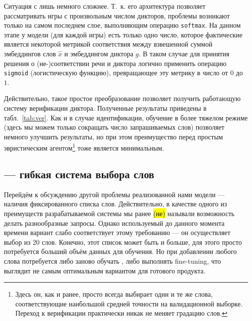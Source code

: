 Ситуация с \guesser{} лишь немного сложнее. Т.~к. его архитектура позволяет
рассматривать игры с произвольным числом дикторов, проблемы возникают только на
самом последнем слое, выполняющим операцию \texttt{softmax}. На данном этапе у
модели (для каждой игры) есть только одно число, которое фактические является
некоторой метрикой соответствия между взвешенной суммой эмбеддингов слов
$\hat{x}$ и эмбеддингом диктора $g$. В таком случае для принятия решения о
(не-)соответствии речи и диктора логично применить операцию \texttt{sigmoid}
(логистическую функцию), превращающее эту метрику в число от $0$ до $1$.

Действительно, такое простое преобразование позволяет получить работающую
систему верификации диктора. Полученные результаты приведены в
табл.~\ref{tab:ver}. Как и в случае идентификации, обучение в более тяжелом
режиме (здесь мы можем только сокращать число запрашиваемых слов) позволяет
немного улучшить результаты, но при этом преимущество перед простым эвристическим
агентом\footnote{
    Здесь он, как и ранее, просто всегда выбирает одни и те же слова,
    соответствующие наибольшой средней точности на валидационной выборке.
    Переход к верификации практически никак не меняет градацию слов.
} тоже является минимальным.

\subsection{\cbenquirer{} --- гибкая система выбора слов}

Перейдём к обсуждению другой проблемы реализованной нами модели --- наличия
фиксированного списка слов. Действительно, в качестве одного из преимуществ
разрабатываемой системы мы ранее \hl{(не)} называли возможность делать
разнообразные запросы. Однако используемый до данного момента времени вариант
\enquirer{} слабо соответствует этому требованию --- он осуществляет выбор из
20 слов. Конечно, этот список может быть и больше, для этого просто потребуется
больший объём данных для обучения. Но при добавлении любого слова потребуется
либо заново обучать \enquirer{}, либо выполнять fine-tuning, что выглядит не
самым оптимальным вариантом для готового продукта.

